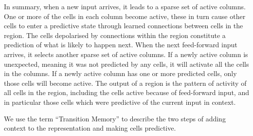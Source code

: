 \begin{enumerate}
In summary, when a new input arrives, it leads to a sparse set of
active columns. One or more of the cells in each column become active,
these in turn cause other cells to enter a predictive state through
learned connections between cells in the region. The cells depolarised
by connections within the region constitute a prediction of what is
likely to happen next. When the next feed-forward input arrives, it
selects another sparse set of active columns. If a newly active column
is unexpected, meaning it was not predicted by any cells, it will
activate all the cells in the columns. If a newly active column has
one or more predicted cells, only those cells will become active. The
output of a region is the pattern of activity of all cells in the region,
including the cells active because of feed-forward input, and in particular those cells
which were predictive of the current input in context.




\end{enumerate}


We use the term ``Transition Memory'' to describe the two steps of
adding context to the representation and making cells predictive. 


